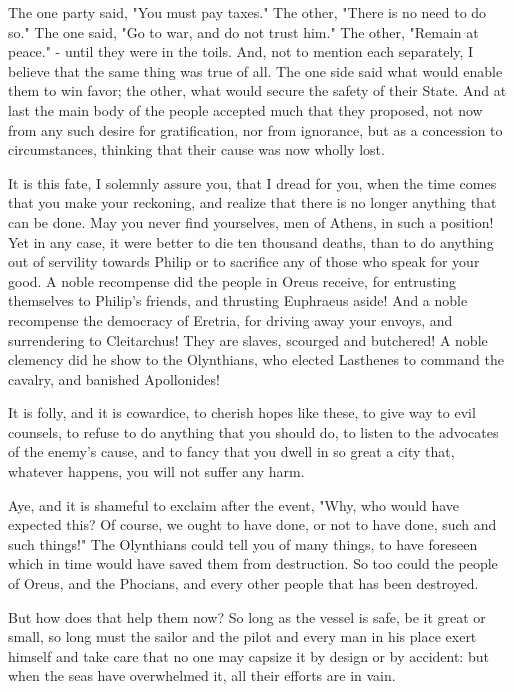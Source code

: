 \documentclass[a4paper]{amsbook}
\begin{document}
The one party said, "You must pay taxes." The other, "There is no need to do so." The one said, "Go to war, and do not trust him." The other, "Remain at peace." - until they were in the toils. And, not to mention each separately, I believe that the same thing was true of all. The one side said what would enable them to win favor; the other, what would secure the safety of their State. And at last the main body of the people accepted much that they proposed, not now from any such desire for gratification, nor from ignorance, but as a concession to circumstances, thinking that their cause was now wholly lost.

It is this fate, I solemnly assure you, that I dread for you, when the time comes that you make your reckoning, and realize that there is no longer anything that can be done. May you never find yourselves, men of Athens, in such a position! Yet in any case, it were better to die ten thousand deaths, than to do anything out of servility towards Philip or to sacrifice any of those who speak for your good. A noble recompense did the people in Oreus receive, for entrusting themselves to Philip's friends, and thrusting Euphraeus aside! And a noble recompense the democracy of Eretria, for driving away your envoys, and surrendering to Cleitarchus! They are slaves, scourged and butchered! A noble clemency did he show to the Olynthians, who elected Lasthenes to command the cavalry, and banished Apollonides!

It is folly, and it is cowardice, to cherish hopes like these, to give way to evil counsels, to refuse to do anything that you should do, to listen to the advocates of the enemy's cause, and to fancy that you dwell in so great a city that, whatever happens, you will not suffer any harm.

Aye, and it is shameful to exclaim after the event, "Why, who would have expected this? Of course, we ought to have done, or not to have done, such and such things!" The Olynthians could tell you of many things, to have foreseen which in time would have saved them from destruction. So too could the people of Oreus, and the Phocians, and every other people that has been destroyed.

But how does that help them now? So long as the vessel is safe, be it great or small, so long must the sailor and the pilot and every man in his place exert himself and take care that no one may capsize it by design or by accident: but when the seas have overwhelmed it, all their efforts are in vain.
\end{document}
